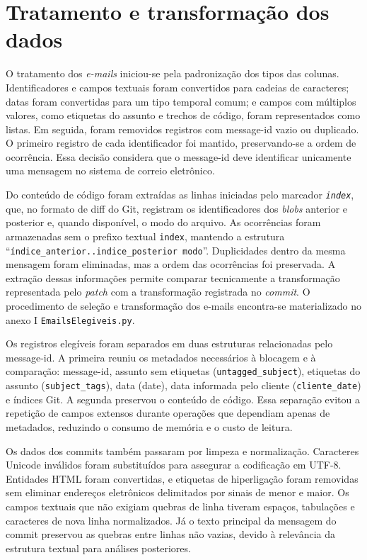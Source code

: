 \section{Tratamento e transformação dos dados}
O tratamento dos \textit{e-mails} iniciou-se pela padronização dos tipos das colunas. Identificadores e campos textuais foram convertidos para cadeias de caracteres; datas foram convertidas para um tipo temporal comum; e campos com múltiplos valores, como etiquetas do assunto e trechos de código, foram representados como listas. Em seguida, foram removidos registros com message-id vazio ou duplicado. O primeiro registro de cada identificador foi mantido, preservando-se a ordem de ocorrência. Essa decisão considera que o message-id deve identificar unicamente uma mensagem no sistema de correio eletrônico.

Do conteúdo de código foram extraídas as linhas iniciadas pelo marcador \texttt{\textit{index}}, que, no formato de diff do Git, registram os identificadores dos \textit{blobs} anterior e posterior e, quando disponível, o modo do arquivo. As ocorrências foram armazenadas sem o prefixo textual \texttt{index}, mantendo a estrutura ``\texttt{índice\_anterior..indice\_posterior modo}''. Duplicidades dentro da mesma mensagem foram eliminadas, mas a ordem das ocorrências foi preservada. A extração dessas informações permite comparar tecnicamente a transformação representada pelo \textit{patch} com a transformação registrada no \textit{commit}. O procedimento de seleção e transformação dos e-mails encontra-se materializado no anexo I \texttt{EmailsElegiveis.py}.
 
Os registros elegíveis foram separados em duas estruturas relacionadas pelo message-id. A primeira reuniu os metadados necessários à blocagem e à comparação: message-id, assunto sem etiquetas (\texttt{untagged\_subject}), etiquetas do assunto (\texttt{subject\_tags}), data (date), data informada pelo cliente (\texttt{cliente\_date}) e índices Git. A segunda preservou o conteúdo de código. Essa separação evitou a repetição de campos extensos durante operações que dependiam apenas de metadados, reduzindo o consumo de memória e o custo de leitura.

Os dados dos commits também passaram por limpeza e normalização. Caracteres Unicode inválidos foram substituídos para assegurar a codificação em UTF-8. Entidades HTML foram convertidas, e etiquetas de hiperligação foram removidas sem eliminar endereços eletrônicos delimitados por sinais de menor e maior. Os campos textuais que não exigiam quebras de linha tiveram espaços, tabulações e caracteres de nova linha normalizados. Já o texto principal da mensagem do commit preservou as quebras entre linhas não vazias, devido à relevância da estrutura textual para análises posteriores. 

